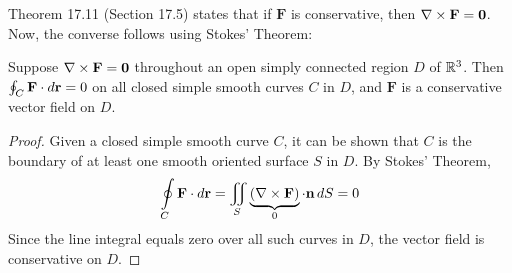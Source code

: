 \documentclass[../mathNotesPreamble]{subfiles}
\begin{document}
  \noindent
  Theorem 17.11 (Section 17.5) states that if $\mathbf F$ is conservative, then $\nabla\times\mathbf F=\mathbf{0}$. Now, the converse follows using Stokes' Theorem:

  \begin{thmBox*}[Theorem 17.16: Curl $\mathbf F=\bfO$ implies $\mathbf F$ Is Conservative]
    Suppose $\nabla\times\mathbf F=\mathbf{0}$ throughout an open simply connected region $D$ of $\mathbb{R}^3$. Then $\oint_C\mathbf F\cdot d{\mathbf{r}}=0$ on all closed simple smooth curves $C$ in $D$, and $\mathbf F$ is a conservative vector field on $D$.
  \end{thmBox*}
  \begin{proof}
    Given a closed simple smooth curve $C$, it can be shown that $C$ is the boundary of at least one smooth oriented surface $S$ in $D$. By Stokes' Theorem,
      \[\oint\limits_C \mathbf F\cdot d{\mathbf{r}}=\iint\limits_S \underbrace{{\left(\nabla\times\mathbf F\right)}}_{0}\cdot{\mathbf{n}}\,dS=0\]
    Since the line integral equals zero over all such curves in $D$, the vector field is conservative on $D$.
  \end{proof}

  \pagebreak
  
\end{document}
